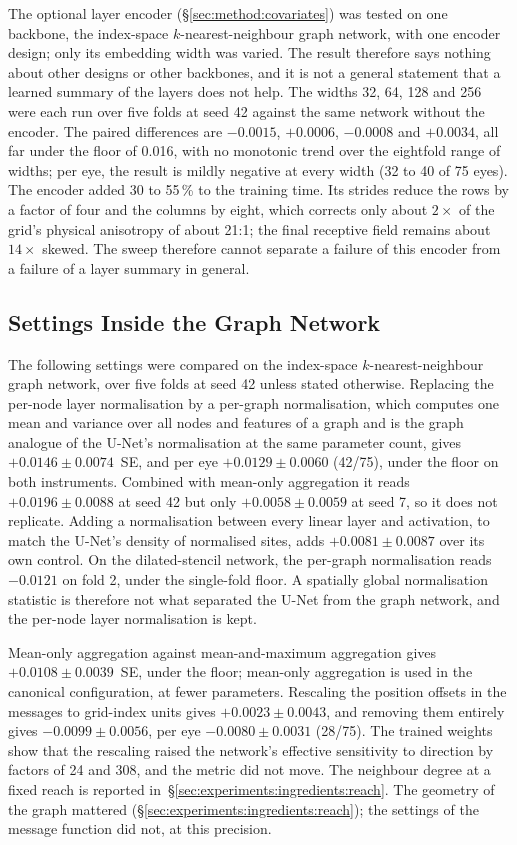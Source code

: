 The optional layer encoder (\S\ref{sec:method:covariates}) was tested on one
backbone, the index-space $k$-nearest-neighbour graph network, with one
encoder design; only its embedding width was varied. The result therefore
says nothing about other designs or other backbones, and it is not a
general statement that a learned summary of the layers does not help. The
widths 32, 64, 128 and 256 were each run over five folds at seed 42 against
the same network without the encoder. The paired differences are
$-0.0015$, $+0.0006$, $-0.0008$ and $+0.0034$, all far under the floor of
0.016, with no monotonic trend over the eightfold range of widths; per eye,
the result is mildly negative at every width (32 to 40 of 75 eyes). The
encoder added 30 to 55\,\% to the training time. Its strides reduce the
rows by a factor of four and the columns by eight, which corrects only
about $2\times$ of the grid's physical anisotropy of about 21:1; the final
receptive field remains about $14\times$ skewed. The sweep therefore cannot
separate a failure of this encoder from a failure of a layer summary in
general.

\subsection{Settings Inside the Graph Network}
\label{sec:experiments:ablations:gnn}

The following settings were compared on the index-space
$k$-nearest-neighbour graph network, over five folds at seed 42 unless
stated otherwise. Replacing the per-node layer normalisation by a per-graph
normalisation, which computes one mean and variance over all nodes and
features of a graph and is the graph analogue of the U-Net's normalisation
at the same parameter count, gives $+0.0146 \pm 0.0074$~SE, and per eye
$+0.0129 \pm 0.0060$ (42/75), under the floor on both instruments. Combined
with mean-only aggregation it reads $+0.0196 \pm 0.0088$ at seed 42 but
only $+0.0058 \pm 0.0059$ at seed 7, so it does not replicate. Adding a
normalisation between every linear layer and activation, to match the
U-Net's density of normalised sites, adds $+0.0081 \pm 0.0087$ over its own
control. On the dilated-stencil network, the per-graph normalisation reads
$-0.0121$ on fold 2, under the single-fold floor. A spatially global
normalisation statistic is therefore not what separated the U-Net from the
graph network, and the per-node layer normalisation is kept.

Mean-only aggregation against mean-and-maximum aggregation gives
$+0.0108 \pm 0.0039$~SE, under the floor; mean-only aggregation is used in
the canonical configuration, at fewer parameters. Rescaling the position
offsets in the messages to grid-index units gives $+0.0023 \pm 0.0043$, and
removing them entirely gives $-0.0099 \pm 0.0056$, per eye
$-0.0080 \pm 0.0031$ (28/75). The trained weights show that the rescaling
raised the network's effective sensitivity to direction by factors of 24
and 308, and the metric did not move. The neighbour degree at a fixed reach
is reported in~\S\ref{sec:experiments:ingredients:reach}. The geometry of
the graph mattered (\S\ref{sec:experiments:ingredients:reach}); the
settings of the message function did not, at this precision.
\fi

